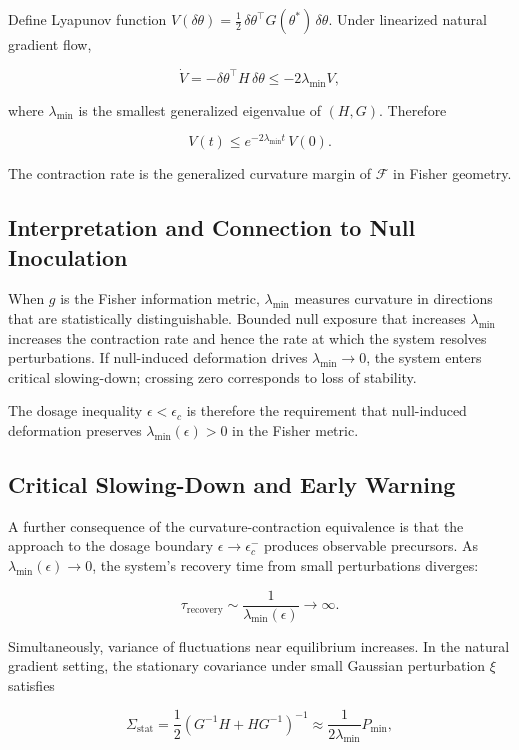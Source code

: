 \documentclass[11pt]{article}
\theoremstyle{remark}
\begin{document}
Define Lyapunov function $V(\delta\theta) = \frac{1}{2}\,\delta\theta^\top G(\theta^*)\,\delta\theta$. Under linearized natural gradient flow,

\[
\dot{V}
=
-\delta\theta^\top H\,\delta\theta
\le
-2\lambda_{\min} V,
\]

where $\lambda_{\min}$ is the smallest generalized eigenvalue of $(H, G)$. Therefore

\[
V(t) \le e^{-2\lambda_{\min} t}\,V(0).
\]

The contraction rate is the generalized curvature margin of $\mathcal{F}$ in Fisher geometry.

\subsection{Interpretation and Connection to Null Inoculation}

When $g$ is the Fisher information metric, $\lambda_{\min}$ measures curvature in directions that are statistically distinguishable. Bounded null exposure that increases $\lambda_{\min}$ increases the contraction rate and hence the rate at which the system resolves perturbations. If null-induced deformation drives $\lambda_{\min} \to 0$, the system enters critical slowing-down; crossing zero corresponds to loss of stability.

The dosage inequality $\epsilon < \epsilon_c$ is therefore the requirement that null-induced deformation preserves $\lambda_{\min}(\epsilon) > 0$ in the Fisher metric.

\subsection{Critical Slowing-Down and Early Warning}
\label{sec:slowing_down}

A further consequence of the curvature-contraction equivalence is that the approach to the dosage boundary $\epsilon \to \epsilon_c^-$ produces observable precursors. As $\lambda_{\min}(\epsilon) \to 0$, the system's recovery time from small perturbations diverges:

\[
\tau_{\text{recovery}} \sim \frac{1}{\lambda_{\min}(\epsilon)} \to \infty.
\]

Simultaneously, variance of fluctuations near equilibrium increases. In the natural gradient setting, the stationary covariance under small Gaussian perturbation $\xi$ satisfies

\[
\Sigma_{\text{stat}} = \frac{1}{2} (G^{-1}H + H G^{-1})^{-1} \approx \frac{1}{2\lambda_{\min}} P_{\min},
\]
\end{document}
